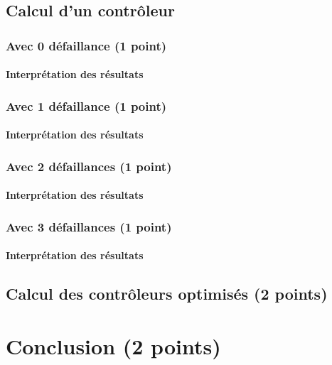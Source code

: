 \documentclass[a4paper]{book}
\begin{document}
\subsection{Calcul d'un contrôleur}

\subsubsection{Avec 0 défaillance (1 point)}





\paragraph{Interprétation des résultats}

\subsubsection{Avec 1 défaillance (1 point)}





\paragraph{Interprétation des résultats}

\subsubsection{Avec 2 défaillances (1 point)}





\paragraph{Interprétation des résultats}

\subsubsection{Avec 3 défaillances (1 point)}





\paragraph{Interprétation des résultats}

\subsection{Calcul des contrôleurs optimisés (2 points)}

\section{Conclusion (2 points)}
\end{document}
